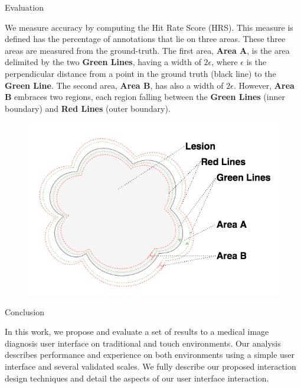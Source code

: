 \documentclass[final]{beamer}
\newlength{\onecolwid}
\begin{document}
\begin{frame}[t]
\begin{columns}[t]
\begin{column}{\onecolwid}
\begin{block}{Evaluation}

We measure accuracy by computing the Hit Rate Score (HRS). This measure is defined has the percentage of annotations that lie on three areas. These three areas are measured from the ground-truth. The first area, \textbf{Area A}, is the area delimited by the two \textbf{Green Lines}, having a width of $2\epsilon$, where $\epsilon$ is the perpendicular distance from a point in the ground truth (black line) to the \textbf{Green Line}. The second area, \textbf{Area B}, has also a width of $2\epsilon$. However,  \textbf{Area B} embraces two regions, each region falling between the \textbf{Green Lines} (inner boundary) and \textbf{Red Lines} (outer boundary).

\begin{figure}
  \begin{center}
  \includegraphics[width=25cm]{mimbcd-ui_areas.png}
  \end{center}
\end{figure}

\end{block}

\begin{block}{Conclusion}

In this work, we propose and evaluate a set of results to a medical image diagnosis user interface on traditional and touch environments. Our analysis describes performance and experience on both environments using a simple user interface and several validated scales. We fully describe our proposed interaction design techniques and detail the aspects of our user interface interaction.


\end{block}
\end{column}
\end{columns}
\end{frame}
\end{document}
